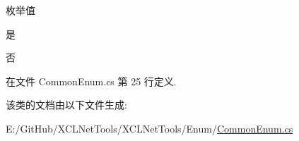 \begin{Desc}
\item[枚举值]\par
\begin{description}
\item[{\em 
是\hypertarget{class_x_c_l_net_tools_1_1_enum_1_1_common_enum_a5940e298dc09411c8a238f4f4e94e633a0a60ac8f02ccd2cf723f927284877851}{}\label{class_x_c_l_net_tools_1_1_enum_1_1_common_enum_a5940e298dc09411c8a238f4f4e94e633a0a60ac8f02ccd2cf723f927284877851}
}]是 \item[{\em 
否\hypertarget{class_x_c_l_net_tools_1_1_enum_1_1_common_enum_a5940e298dc09411c8a238f4f4e94e633ac9744f45e76d885ae1c74d4f4a934b2e}{}\label{class_x_c_l_net_tools_1_1_enum_1_1_common_enum_a5940e298dc09411c8a238f4f4e94e633ac9744f45e76d885ae1c74d4f4a934b2e}
}]否 \end{description}
\end{Desc}


在文件 Common\+Enum.\+cs 第 25 行定义.



该类的文档由以下文件生成\+:\begin{DoxyCompactItemize}
\item 
E\+:/\+Git\+Hub/\+X\+C\+L\+Net\+Tools/\+X\+C\+L\+Net\+Tools/\+Enum/\hyperlink{_common_enum_8cs}{Common\+Enum.\+cs}\end{DoxyCompactItemize}
